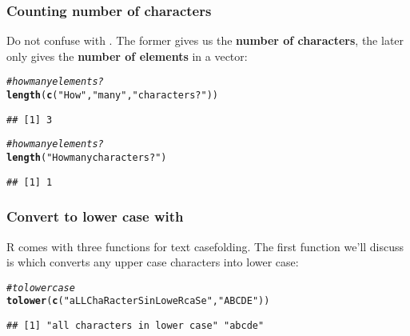 \documentclass[12pt]{beamer}\usepackage[]{graphicx}\usepackage[]{color}
\makeatletter
\newcommand{\hlstr}[1]{\textcolor[rgb]{0.192,0.494,0.8}{#1}}%
\newcommand{\hlcom}[1]{\textcolor[rgb]{0.678,0.584,0.686}{\textit{#1}}}%
\newcommand{\hlstd}[1]{\textcolor[rgb]{0.345,0.345,0.345}{#1}}%
\newcommand{\hlkwd}[1]{\textcolor[rgb]{0.737,0.353,0.396}{\textbf{#1}}}%
\newenvironment{kframe}{%
 \def\at@end@of@kframe{}%
 \ifinner\ifhmode%
  \def\at@end@of@kframe{\end{minipage}}%
  \begin{minipage}{\columnwidth}%
 \fi\fi%
 \def\FrameCommand##1{\hskip\@totalleftmargin \hskip-\fboxsep
 \colorbox{shadecolor}{##1}\hskip-\fboxsep
     \hskip-\linewidth \hskip-\@totalleftmargin \hskip\columnwidth}%
 \MakeFramed {\advance\hsize-\width
   \@totalleftmargin\z@ \linewidth\hsize
   \@setminipage}}%
 {\par\unskip\endMakeFramed%
 \at@end@of@kframe}
\newenvironment{knitrout}{}{} %
\makeatother
\begin{document}

\begin{frame}[fragile]
\frametitle{Counting number of characters}

Do not confuse  with . The former gives us the \textbf{number of characters}, the later only gives the \textbf{number of elements} in a vector:
\begin{knitrout}\footnotesize
{}\color{fgcolor}\begin{kframe}
\begin{alltt}
\hlcom{# how many elements?}
\hlkwd{length}\hlstd{(}\hlkwd{c}\hlstd{(}\hlstr{"How"}\hlstd{,} \hlstr{"many"}\hlstd{,} \hlstr{"characters?"}\hlstd{))}
\end{alltt}
\begin{verbatim}
## [1] 3
\end{verbatim}
\begin{alltt}
\hlcom{# how many elements?}
\hlkwd{length}\hlstd{(}\hlstr{"How many characters?"}\hlstd{)}
\end{alltt}
\begin{verbatim}
## [1] 1
\end{verbatim}
\end{kframe}
\end{knitrout}

\end{frame}


\begin{frame}[fragile]
\frametitle{Convert to lower case with }

R comes with three functions for text casefolding. The first function we'll discuss is  which converts any upper case characters into lower case:
\begin{knitrout}\footnotesize
{}\color{fgcolor}\begin{kframe}
\begin{alltt}
\hlcom{# to lower case}
\hlkwd{tolower}\hlstd{(}\hlkwd{c}\hlstd{(}\hlstr{"aLL ChaRacterS in LoweR caSe"}\hlstd{,} \hlstr{"ABCDE"}\hlstd{))}
\end{alltt}
\begin{verbatim}
## [1] "all characters in lower case" "abcde"
\end{verbatim}
\end{kframe}
\end{knitrout}

\end{frame}
\end{document}
